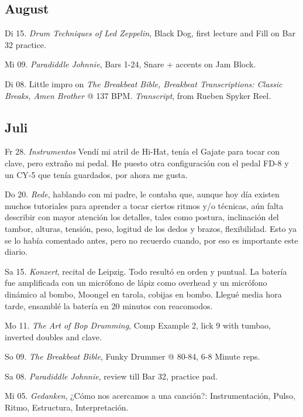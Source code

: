 \documentclass[
]{book}
\begin{document}
\hypertarget{august-2023}{%
\subsection*{August}\label{august-2023}}

Di 15. \emph{Drum Techniques of Led Zeppelin}, Black Dog, first lecture and Fill on Bar 32 practice.

Mi 09. \emph{Paradiddle Johnnie}, Bars 1-24, Snare + accents on Jam Block.

Di 08. Little impro on \emph{The Breakbeat Bible, Breakbeat Transcriptions: Classic Breaks, Amen Brother} @ 137 BPM. \emph{Transcript}, from Rueben Spyker Reel.

\hypertarget{juli-2023}{%
\subsection*{Juli}\label{juli-2023}}

Fr 28. \emph{Instrumentos} Vendí mi atril de Hi-Hat, tenía el Gajate para tocar con clave, pero extraño mi pedal. He puesto otra configuración con el pedal FD-8 y un CY-5 que tenía guardados, por ahora me gusta.

Do 20. \emph{Rede}, hablando con mi padre, le contaba que, aunque hoy día existen muchos tutoriales para aprender a tocar ciertos ritmos y/o técnicas, aún falta describir con mayor atención los detalles, tales como postura, inclinación del tambor, alturas, tensión, peso, logitud de los dedos y brazos, flexibilidad. Esto ya se lo había comentado antes, pero no recuerdo cuando, por eso es importante este diario.

Sa 15. \emph{Konzert}, recital de Leipzig. Todo resultó en orden y puntual. La batería fue amplificada con un micrófono de lápiz como overhead y un micrófono dinámico al bombo, Moongel en tarola, cobijas en bombo. Llegué media hora tarde, ensamblé la batería en 20 minutos con reacomodos.

Mo 11. \emph{The Art of Bop Drumming}, Comp Example 2, lick 9 with tumbao, inverted doubles and clave.

So 09. \emph{The Breakbeat Bible}, Funky Drummer @ 80-84, 6-8 Minute reps.

Sa 08. \emph{Paradiddle Johnnie}, review till Bar 32, practice pad.

Mi 05. \emph{Gedanken}, ¿Cómo nos acercamos a una canción?: Instrumentación, Pulso, Ritmo, Estructura, Interpretación.
\end{document}
